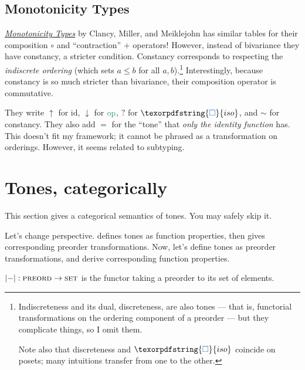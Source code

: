 \documentclass{rntz}
\newcommand{\cat}[1]{\textsc{#1}} %
\newcommand{\Pre}{\cat{preord}}
\newcommand{\Set}{\cat{set}}
\newcommand\opcolor{\color{ForestGreen}}
\newcommand\isocolor{\color{NavyBlue}}
\newcommand\id{\ensuremath{\mathrm{id}}}
\newcommand\op{\ensuremath{\mathrm{\opcolor op}}}
\newcommand\iso{\texorpdfstring{\ensuremath{{\isocolor\Box}}}{iso}}
\begin{document}
\subsection{Monotonicity Types}

\href{https://infoscience.epfl.ch/record/231867/files/monotonicity-types.pdf}{\emph{Monotonicity
    Types}} by Clancy, Miller, and Meiklejohn has similar tables for their
composition $\circ$ and ``contraction'' $+$ operators! However, instead of
bivariance they have constancy, a stricter condition.
%
Constancy corresponds to respecting the \emph{indiscrete ordering} (which sets
$a \le b$ for all $a,b$).\footnote{Indiscreteness and its dual, discreteness,
  are also tones --- that is, functorial transformations on the ordering
  component of a preorder --- but they complicate things, so I omit them.

  Note also that discreteness and $\iso$ coincide on posets; many intuitions
  transfer from one to the other.}
%
Interestingly, because constancy is so much stricter than bivariance, their
composition operator is commutative.

They write $\uparrow$ for $\id$, $\downarrow$ for $\op$, $?$ for $\iso$, and
$\sim$ for constancy. They also add $=$ for the ``tone'' that \emph{only the
  identity function} has. This doesn't fit my framework; it cannot be phrased as
a transformation on orderings. However, it seems related to subtyping.



\section{Tones, categorically}

\newcommand{\elems}[1]{\ensuremath{|{#1}|}}
\newcommand{\elemsfn}[0]{\elems{-}}


This section gives a categorical semantics of tones. You may safely skip it.

Let's change perspective.  defines tones as function
pro\-per\-ties, then gives corresponding pre\-order trans\-form\-ations. Now,
let's define tones as preorder transformations, and derive corresponding
function properties.

\begin{definition}
  $\elemsfn : \Pre \to \Set$ is the functor taking a preorder to its set of
  elements.
\end{definition}
\end{document}
